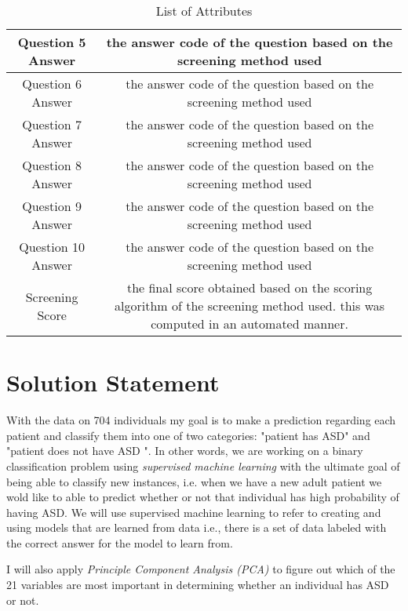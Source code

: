 \documentclass[12pt, oneside]{article}
\theoremstyle{definition}
\begin{document}
\begin{center}
\begin{table}[h]
\begin{adjustbox}{width=1\textwidth}
\begin{tabular}{ |c|c|}
Question 5 Answer &  the answer code of the question based on the screening method used\\  \hline
Question 6 Answer &  the answer code of the question based on the screening method used\\  \hline
Question 7 Answer &  the answer code of the question based on the screening method used\\  \hline
Question 8 Answer & the answer code of the question based on the screening method used \\  \hline
Question 9 Answer & the answer code of the question based on the screening method used\\  \hline
Question 10 Answer &  the answer code of the question based on the screening method used\\ \hline
Screening Score &  the final score obtained based on the scoring algorithm of the screening method used. \newline this was computed in an automated manner.\\  \hline
\end{tabular}
\end{adjustbox}
\caption{List of Attributes\label{t2}}
\end{table}
\end{center}
\section{Solution Statement}
With the data on 704 individuals my goal is to make a prediction regarding each patient and classify them into one of two categories: "patient has ASD" and "patient does not have ASD ". In other words, we are working on a binary classification problem using {\it supervised machine learning} with the ultimate goal of being able to classify new instances, i.e. when we have a new adult patient we wold like to able to predict whether or not that individual has high probability of having ASD.  We will use supervised machine learning to refer to creating and using models that are learned from data i.e., there is a set of data labeled with the correct answer for the model to learn from. 

I will also apply {\it Principle Component Analysis (PCA)} to figure out which of the 21 variables are most important in determining whether an individual has ASD or not.
\end{document}

